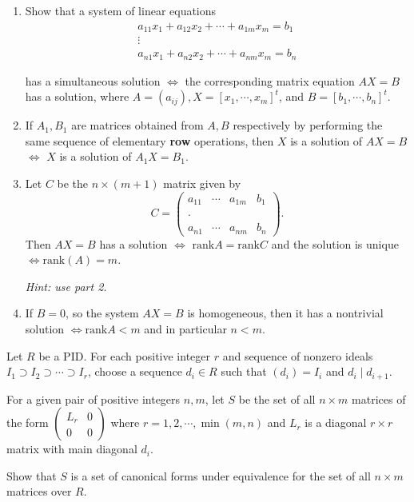 \begin{problem}[Hungerford 7.2.4]
\hfill
\begin{enumerate}
    \item Show that a system of linear equations
$$
\begin{array}{l}{
a_{11} x_{1}+a_{12} x_{2}+\cdots+a_{1 m} x_{m}=b_{1}} 
\\ 
\vdots 
\\ 
{a_{n 1} x_{1}+a_{n 2} x_{2}+\cdots+a_{n m} x_{m}=b_{n}}
\end{array}
$$

has a simultaneous solution $\iff$ the corresponding matrix equation $AX = B$ has a solution, where $A = (a_{ij}), X = [x_1, \cdots, x_m]^t$, and $B = [b_1, \cdots , b_n]^t$.

    \item If $A_1, B_1$ are matrices obtained from $A, B$ respectively by performing the same sequence of elementary \textbf{row} operations, then $X$ is a solution of $AX=B$ $\iff$ $X$ is a solution of $A_1 X = B_1$.
    
    \item Let $C$ be the $n \times (m+1)$ matrix given by 
    $$
    C = \left(\begin{array}{llll}{a_{11}} & {\cdots} & {a_{1 m}} & {b_{1}} \\ {} & {} & {} \\ {\cdot} & {} & {} \\ {a_{n 1}} & {\cdots} & {a_{n m}} & {b_{n}}\end{array}\right).
    $$
    Then $AX = B$ has a solution $\iff$ $\mathrm{rank} A = \mathrm{rank} C$ and the solution is unique $\iff \mathrm{rank}(A) = m$.
    
    \textit{Hint: use part 2.}
    
  \item If $B=0$, so the system $AX=B$ is homogeneous, then it has a nontrivial solution $\iff \mathrm{rank} A < m$ and in particular $n<m$.
\end{enumerate}

\end{problem}

\begin{problem}[Hungerford 7.2.5]
Let $R$ be a PID. For each positive integer $r$ and sequence of nonzero ideals $I_1 \supset I_2 \supset \cdots \supset I_r$, choose a sequence $d_i \in R$ such that $(d_i) = I_i$ and $d_i \mid d_{i+1}$.

For a given pair of positive integers $n, m$, let $S$ be the set of all $n\times m$ matrices of the form $\left(\begin{array}{ll}{L_{r}} & {0} \\ {0} & {0}\end{array}\right)$ where $r=1,2,\cdots,\min(m,n)$ and $L_r$ is a diagonal $r\times r$ matrix with main diagonal $d_i$.

Show that $S$ is a set of canonical forms under equivalence for the set of all $n\times m$ matrices over $R$.
\end{problem}

